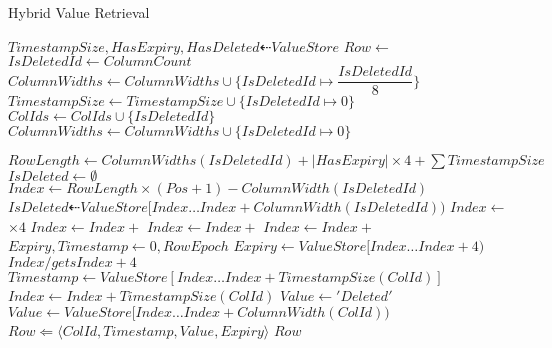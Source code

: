 \documentclass[fleqn]{article}
\begin{document}
\begin{algorithm}
\scriptsize
\caption{Hybrid Value Retrieval}
\begin{algorithmic}[2]
\State $TimestampSize, HasExpiry, HasDeleted \dashleftarrow ValueStore$
\State $Row \gets $ 
\State $IsDeletedId \gets ColumnCount$
 \State $ColumnWidths \gets ColumnWidths \cup \{ IsDeletedId \mapsto $\tiny$\dfrac{IsDeletedId}{8}$\scriptsize$\}$
 \State $TimestampSize \gets TimestampSize \cup \{ IsDeletedId \mapsto 0\}$
 \State $ColIds \gets ColIds \cup \{ IsDeletedId \}$
\Else
 \State $ColumnWidths \gets ColumnWidths \cup \{ IsDeletedId \mapsto 0\}$
\EndIf

\State $RowLength \gets ColumnWidths(IsDeletedId) + \lvert HasExpiry \rvert \times 4 + \sum{TimestampSize}$
\State $IsDeleted \gets \emptyset$
 \State $Index \gets RowLength \times (Pos + 1) - ColumnWidth(IsDeletedId)$
 \State $IsDeleted \dashleftarrow ValueStore[Index \dots Index + ColumnWidth(IsDeletedId))$
\EndIf
{}
 \State $Index \gets $ $\times 4$
 \State $Index \gets Index + $
 \State $Index \gets Index + $
 \State $Index \gets Index + $
 \State $Expiry, Timestamp \gets 0, RowEpoch$
  \State $Expiry \gets ValueStore[Index\dots Index + 4)$
  \State $Index /gets Index + 4$
 \EndIf 
 \State $Timestamp \gets ValueStore[Index \dots Index+TimestampSize(ColId)]$
 \State $Index \gets Index+TimestampSize(ColId)$
  \State $Value \gets 'Deleted'$
 \Else
  \State $Value \gets ValueStore[Index \dots Index + ColumnWidth(ColId))$
 \EndIf
 \State $Row \Leftarrow \langle ColId, Timestamp, Value, Expiry \rangle$
\EndFor
\State \Return $Row$
\EndFunction
\end{algorithmic}
\end{algorithm}
\end{document}

